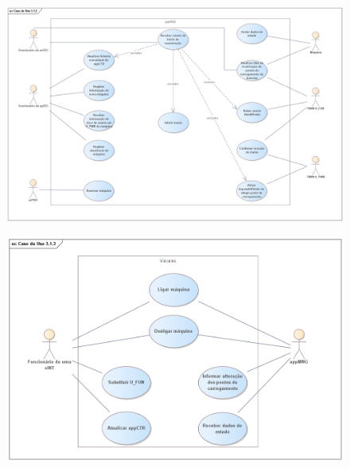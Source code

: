 \documentclass{article}
\begin{document}
    \pagebreak
    \begin{figure}[H]
        \centering
        \vspace*{-1cm}
        \includegraphics[angle=-90,origin=c, scale=0.82]{caso_de_uso_312.png}
    \end{figure}

    \pagebreak
    \begin{figure}[H]
        \centering
        \vspace*{1.6cm}
        \includegraphics[angle=-90,origin=c]{caso_de_uso_313.png}
    \end{figure}
\end{document}
